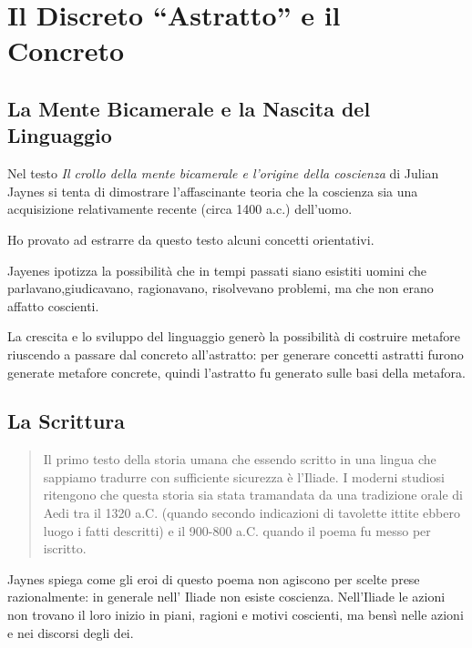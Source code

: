 
\chapter{Il Discreto “Astratto” e il Concreto}
\label{chp:discreto}

\section{La Mente Bicamerale e la Nascita del Linguaggio}

Nel testo \emph{Il crollo della mente bicamerale e l’origine della coscienza}
di Julian Jaynes si tenta di dimostrare l’affascinante teoria che la coscienza
sia una acquisizione relativamente recente (circa 1400 a.c.) dell’uomo.

Ho provato ad estrarre da questo testo alcuni concetti orientativi.

Jayenes ipotizza la possibilità che in tempi passati siano esistiti uomini  che
parlavano,giudicavano, ragionavano, risolvevano problemi, ma che non erano
affatto coscienti.

La crescita e lo sviluppo del linguaggio generò la possibilità di costruire
metafore riuscendo a passare dal concreto all’astratto: per generare concetti
astratti furono generate metafore concrete, quindi l’astratto fu generato sulle
basi della metafora.

\section{La Scrittura}

\begin{quote}
Il primo testo della storia umana che essendo scritto in una lingua che sappiamo
tradurre con sufficiente sicurezza è l’Iliade. I moderni studiosi ritengono che
questa storia  sia stata tramandata da una tradizione orale di Aedi tra il 1320
a.C.  (quando secondo indicazioni di tavolette ittite ebbero luogo i fatti
descritti) e il 900-800 a.C. quando il poema fu messo per iscritto.
\end{quote}

Jaynes spiega come gli eroi di questo poema non agiscono per scelte prese
razionalmente: in generale nell’ Iliade non esiste coscienza. Nell’Iliade  le
azioni non trovano il loro inizio in piani, ragioni e motivi coscienti, ma bensì
nelle azioni e nei discorsi degli  dei.


